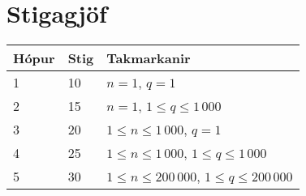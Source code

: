 \section*{Stigagjöf}
\begin{tabular}{|l|l|l|}
\hline
Hópur & Stig & Takmarkanir \\ \hline
1     & 10   & $n = 1$, $q = 1$ \\ \hline
2     & 15   & $n = 1$, $1 \leq q \leq 1\,000$ \\ \hline
3     & 20   & $1 \leq n \leq 1\,000$, $q = 1$ \\ \hline
4     & 25   & $1 \leq n \leq 1\,000$, $1 \leq q \leq 1\,000$ \\ \hline
5     & 30   & $1 \leq n \leq 200\,000$, $1 \leq q \leq 200\,000$ \\ \hline
\end{tabular}
